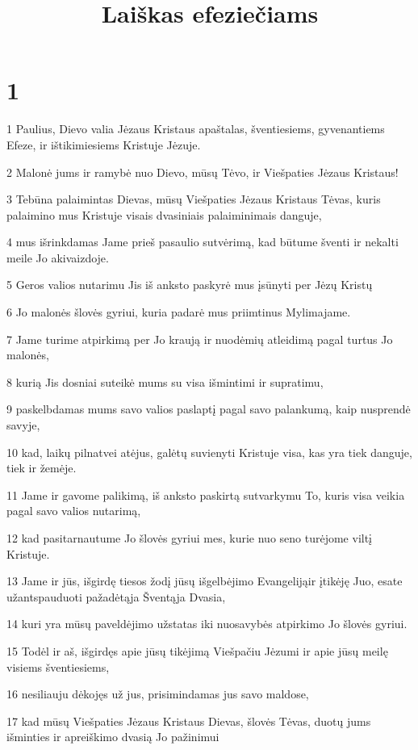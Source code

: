 

\title{Laiškas efeziečiams}

\chapter{1}


\par 1 Paulius, Dievo valia Jėzaus Kristaus apaštalas, šventiesiems, gyvenantiems Efeze, ir ištikimiesiems Kristuje Jėzuje. 
\par 2 Malonė jums ir ramybė nuo Dievo, mūsų Tėvo, ir Viešpaties Jėzaus Kristaus! 
\par 3 Tebūna palaimintas Dievas, mūsų Viešpaties Jėzaus Kristaus Tėvas, kuris palaimino mus Kristuje visais dvasiniais palaiminimais danguje, 
\par 4 mus išrinkdamas Jame prieš pasaulio sutvėrimą, kad būtume šventi ir nekalti meile Jo akivaizdoje. 
\par 5 Geros valios nutarimu Jis iš anksto paskyrė mus įsūnyti per Jėzų Kristų 
\par 6 Jo malonės šlovės gyriui, kuria padarė mus priimtinus Mylimajame. 
\par 7 Jame turime atpirkimą per Jo kraują ir nuodėmių atleidimą pagal turtus Jo malonės, 
\par 8 kurią Jis dosniai suteikė mums su visa išmintimi ir supratimu, 
\par 9 paskelbdamas mums savo valios paslaptį pagal savo palankumą, kaip nusprendė savyje, 
\par 10 kad, laikų pilnatvei atėjus, galėtų suvienyti Kristuje visa, kas yra tiek danguje, tiek ir žemėje. 
\par 11 Jame ir gavome palikimą, iš anksto paskirtą sutvarkymu To, kuris visa veikia pagal savo valios nutarimą, 
\par 12 kad pasitarnautume Jo šlovės gyriui mes, kurie nuo seno turėjome viltį Kristuje. 
\par 13 Jame ir jūs, išgirdę tiesos žodį­ jūsų išgelbėjimo Evangeliją­ir įtikėję Juo, esate užantspauduoti pažadėtąja Šventąja Dvasia, 
\par 14 kuri yra mūsų paveldėjimo užstatas iki nuosavybės atpirkimo Jo šlovės gyriui. 
\par 15 Todėl ir aš, išgirdęs apie jūsų tikėjimą Viešpačiu Jėzumi ir apie jūsų meilę visiems šventiesiems, 
\par 16 nesiliauju dėkojęs už jus, prisimindamas jus savo maldose, 
\par 17 kad mūsų Viešpaties Jėzaus Kristaus Dievas, šlovės Tėvas, duotų jums išminties ir apreiškimo dvasią Jo pažinimui 
